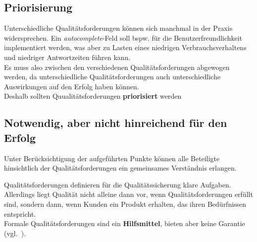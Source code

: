 \subsection*{Priorisierung}
Unterschiedliche Qualitätsforderungen können sich manchmal in der Praxis widersprechen. Ein \textit{autocomplete}-Feld soll bspw. für die Benutzerfreundlichkeit implementiert werden, was aber zu Lasten eines niedrigen Verbrauchsverhaltens und niedriger Antwortzeiten führen kann.\\
Es muss also zwischen den verschiedenen Qualitätsforderungen abgewogen werden, da unterschiedliche Qualitätsforderungen auch unterschiedliche Auswirkungen auf den Erfolg haben können.\\
Deshalb sollten Quualitätsforderungen \textbf{priorisiert} werden

\subsection*{Notwendig, aber nicht hinreichend für den Erfolg}
Unter Berücksichtigung der aufgeführten Punkte können alle Beteiligte hinsichtlich der Qualitätsforderungen ein gemeinsames Verständnis erlangen.

\begin{tcolorbox}[title=Formale Qualitätsforderungen als Hilfsmittel]
    Qualitätsforderungen definieren für die Qualitätssicherung klare Aufgaben.\\
    Allerdings liegt Qualität nicht alleine dann vor, wenn Qualitätsforderungen erfüllt sind, sondern dann, wenn Kunden ein Produkt erhalten, das ihren Bedürfnissen entspricht.\\
    Formale Qualitätsforderungen sind ein \textbf{Hilfsmittel}, bieten aber keine Garantie  (vgl.~\cite[6]{Wed09c}).
\end{tcolorbox}